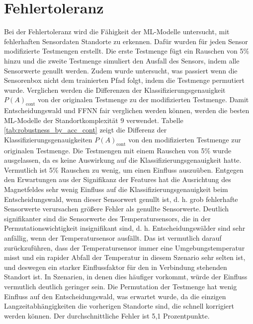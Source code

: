 \section{Fehlertoleranz}
Bei der Fehlertoleranz wird die Fähigkeit der ML-Modelle untersucht, mit fehlerhaften Sensordaten Standorte zu erkennen.
Dafür wurden für jeden Sensor modifizierte Testmengen erstellt.
Die erste Testmenge fügt ein Rauschen von 5\% hinzu und die zweite Testmenge simuliert den Ausfall des Sensors, indem alle Sensorwerte genullt werden.
Zudem wurde untersucht, was passiert wenn die Sensorenbox nicht dem trainierten Pfad folgt, indem die Testmenge permutiert wurde.
Verglichen werden die Differenzen der Klassifizierungsgenauigkeit $P(A)_{\text{cont}}$ von der originalen Testmenge zu der modifizierten Testmenge.
Damit Entscheidungswald und FFNN fair verglichen werden können, werden die besten ML-Modelle der Standortkomplexität 9 verwendet.
\newline
\newline
Tabelle \ref{tab:robustness_by_acc_cont} zeigt die Differenz der Klassifizierungsgenauigkeiten $P(A)_{\text{cont}}$ von den modifizierten Testmenge zur originalen Testmenge.
Die Testmengen mit einem Rauschen von 5\% wurde ausgelassen, da es keine Auswirkung auf die Klassifizierungsgenauigkeit hatte.
Vermutlich ist 5\% Rauschen zu wenig, um einen Einfluss auszuüben.
\newpage
Entgegen den Erwartungen aus der Signifikanz der Features hat die Ausrichtung des Magnetfeldes sehr wenig Einfluss auf die Klassifizierungsgenauigkeit beim Entscheidungswald,
wenn dieser Sensorwert genullt ist, d. h. grob fehlerhafte Sensorwerte verursachen größere Fehler als genullte Sensorwerte.
Deutlich signifikanter sind die Sensorwerte des Temperatursensors, die in der Permutationswichtigkeit insignifikant sind,
d. h. Entscheidungswälder sind sehr anfällig, wenn der Temperatursensor ausfällt.
Das ist vermutlich darauf zurückzuführen, dass der Temperatursensor immer eine Umgebungstemperatur misst und
ein rapider Abfall der Temperatur in diesem Szenario sehr selten ist, und deswegen ein
starker Einflussfaktor für den in Verbindung stehenden Standort ist.
In Szenarien, in denen dies häufiger vorkommt, würde der Einfluss vermutlich deutlich geringer sein.
Die Permutation der Testmenge hat wenig Einfluss auf den Entscheidungswald, was erwartet wurde,
da die einzigen Langzeitabhängigkeiten die vorherigen Standorte sind, die schnell korrigiert werden können.
Der durchschnittliche Fehler ist 5,1 Prozentpunkte.
